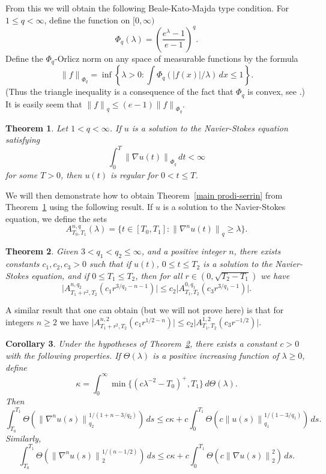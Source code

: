 \documentclass[12pt]{amsart}
\newtheorem{thm}{Theorem}[section]
\newtheorem{cor}[thm]{Corollary}
\theoremstyle{remark}
\newcommand{\smodo}[1]{{\mathopen|#1\mathclose|}}
\newcommand{\snormo}[1]{{\mathopen\|#1\mathclose\|}}
\begin{document}
From this we will obtain the following
Beale-Kato-Majda type condition.
For $ 1 \le q < \infty$, define the function on $[0,\infty)$
$$ \Phi_q(\lambda) = \left(\frac{e^\lambda-1}{e-1}\right)^q .$$
Define the
$\Phi_q$-Orlicz norm on
any space of measurable functions by the formula
$$ \snormo f_{\Phi_q} = 
   \inf\left\{\lambda>0:
   \int \Phi_q(\smodo{f(x)}/\lambda) \, dx \le 1 \right\} .$$
(Thus the triangle inequality is a consequence of the fact that
$\Phi_q$ is convex, see \cite{kras-rutickii}.)  
It is easily seem that 
$\snormo f_q \le (e-1) \snormo f_{\Phi_q}$.


\begin{thm} \label{main beale-kato-majda}
Let 
$1<q < \infty$.
If $u$ is a solution to the Navier-Stokes equation satisfying
$$ \int_0^T \snormo{\nabla u(t)}_{\Phi_q}
   \, dt < \infty $$
for some $T>0$, 
then $u(t)$ 
is regular for $0 < t\le T$.
\end{thm}

We will then demonstrate how to obtain Theorem~\ref{main prodi-serrin}
from Theorem~\ref{main beale-kato-majda} using the following
result.  If $u$ is a solution to the Navier-Stokes equation, we define the
sets
$$ A^{n,q}_{T_0,T_1}(\lambda) =
   \{ t\in[T_0,T_1] :
   \snormo{\nabla^n u(t)}_q \ge \lambda \} .$$

\begin{thm} \label{main foias-guillope-temam}
Given $3 < q_1 < q_2 \le \infty$, and a positive integer $n$,
there exists
constants $c_1,c_2,c_3>0$ such that
if $u(t)$, $0 \le t \le T_2$ 
is a solution to the Navier-Stokes equation, and if $0\le T_1 \le T_2$,
then for all
$r \in (0,\sqrt{T_2-T_1})$ we have
$$ \smodo{A^{n,q_2}_{T_1+r^2,T_2}(c_1 r^{3/q_2-n-1})} 
   \le c_2 \smodo{A^{0,q_1}_{T_1,T_2}(c_3 r^{3/q_1-1})} .$$
\end{thm}

A similar result that one can obtain (but we will not prove here) is 
that for integers $n \ge 2$ we have
$ \smodo{A^{n,2}_{T_1+r^2,T_2}(c_1 r^{1/2-n})} 
   \le c_2 \smodo{A^{1,2}_{T_1,T_2}(c_3 r^{-1/2})} $.

\begin{cor} 
\label{cor foias-guillope-temam}
Under the hypotheses of Theorem~\ref{main foias-guillope-temam}, there
exists a constant $c>0$ with the following properties.
If
$\Theta(\lambda)$ is a positive increasing function of $\lambda\ge 0$,
define 
$$ \kappa = 
   \int_0^\infty \min\{(c\lambda^{-2}-T_0)^+,T_1\} \, d\Theta(\lambda) .$$
Then
$$
   \int_{T_0}^{T_1} \Theta(\snormo{\nabla^n u(s)}_{q_2}^{1/(1+n-3/q_2)}) \, ds
   \le 
   c \kappa + c \int_0^{T_1} \Theta(c\snormo{u(s)}_{q_1}^{1/(1-3/q_1)}) \, ds .
$$
Similarly,
$$
   \int_{T_0}^{T_1} \Theta(\snormo{\nabla^n u(s)}_2^{1/(n-1/2)}) \, ds
   \le 
   c \kappa + c \int_0^{T_1} \Theta(c\snormo{\nabla u(s)}_2^2) \, ds .
$$
\end{cor}
\end{document}
